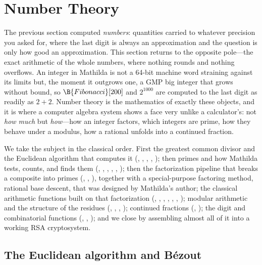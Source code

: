 \section{Number Theory}
\label{sec:numbertheory}

The previous section computed \emph{numbers}: quantities carried to whatever precision
you asked for, where the last digit is always an approximation and the question is only
how good an approximation. This section returns to the opposite pole---the exact
arithmetic of the whole numbers, where nothing rounds and nothing overflows. An integer
in Mathilda is not a 64-bit machine word straining against its limits but, the moment it
outgrows one, a GMP big integer that grows without bound, so
\(\B{Fibonacci}[200]\) and \(2^{1000}\) are computed to the last digit as readily as
\(2+2\). Number theory is the mathematics of exactly these objects, and it is where a
computer algebra system shows a face very unlike a calculator's: not \emph{how much} but
\emph{how}---how an integer factors, which integers are prime, how they behave under a
modulus, how a rational unfolds into a continued fraction.

We take the subject in the classical order. First the greatest common divisor and the
Euclidean algorithm that computes it (, , , ,
); then primes and how Mathilda tests, counts, and finds them (,
, , , , ); then the
factorization pipeline that breaks a composite into primes (,
, ), together with a special-purpose factoring method,
rational base descent, that was designed by Mathilda's author; the
classical arithmetic functions built on that factorization (,
, , , , ,
); modular arithmetic and the structure of the residues (,
, , ); continued fractions
(, ); the digit and combinatorial functions
(, , ); and we close by assembling almost all
of it into a working RSA cryptosystem.

\subsection{The Euclidean algorithm and B\'ezout}
\label{ssec:nt-euclid}

